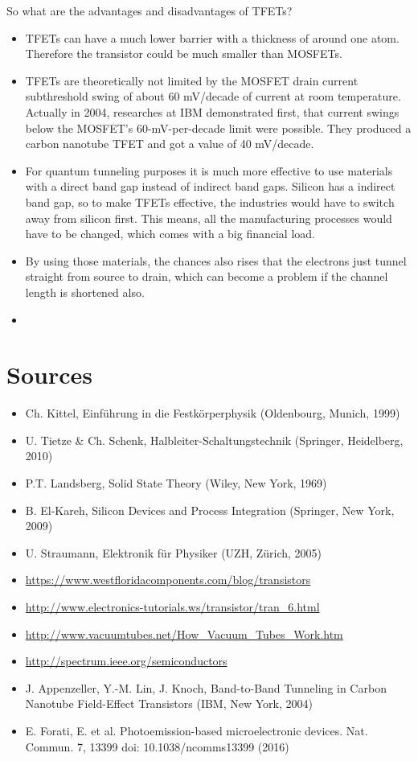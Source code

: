 \documentclass[11pt]{article}
\begin{document}
So what are the advantages and disadvantages of TFETs?
\begin{itemize}
 \item TFETs can have a much lower barrier with a thickness of around one atom. Therefore the transistor could be much smaller than MOSFETs. 
 \item TFETs are theoretically not limited by the MOSFET drain current subthreshold swing of about 60 mV/decade of current at room temperature. Actually in 2004, researches at IBM demonstrated first, that current swings below the MOSFET’s 60-mV-per-decade limit were possible. They produced a carbon nanotube TFET and got a value of 40 mV/decade. 
 \item For quantum tunneling purposes it is much more effective to use materials with a direct band gap instead of indirect band gaps. Silicon has a indirect band gap, so to make TFETs effective, the industries would have to switch away from silicon first. This means, all the manufacturing processes would have to be changed, which comes with a big financial load. 
 \item By using those materials, the chances also rises that the electrons just tunnel straight from source to drain, which can become a problem if the channel length is shortened also. 
 \item 
\end{itemize}





\section{Sources}
\begin{itemize}
 \item Ch. Kittel, Einführung in die Festkörperphysik (Oldenbourg, Munich, 1999)
 \item U. Tietze \& Ch. Schenk, Halbleiter-Schaltungstechnik (Springer, Heidelberg, 2010)
 \item P.T. Landsberg, Solid State Theory (Wiley, New York, 1969)
 \item B. El-Kareh, Silicon Devices and Process Integration (Springer, New York, 2009)
 \item U. Straumann, Elektronik für Physiker (UZH, Zürich, 2005)
 \item \url{https://www.westfloridacomponents.com/blog/transistors}
 \item \url{http://www.electronics-tutorials.ws/transistor/tran_6.html}
 \item \url{http://www.vacuumtubes.net/How_Vacuum_Tubes_Work.htm}
 \item \url{http://spectrum.ieee.org/semiconductors}
 \item J. Appenzeller, Y.-M. Lin, J. Knoch, Band-to-Band Tunneling in Carbon Nanotube Field-Effect Transistors (IBM, New York, 2004)
 \item E. Forati, E. et al. Photoemission-based microelectronic devices. Nat. Commun. 7, 13399 doi: 10.1038/ncomms13399 (2016)
\end{itemize}
\end{document}
